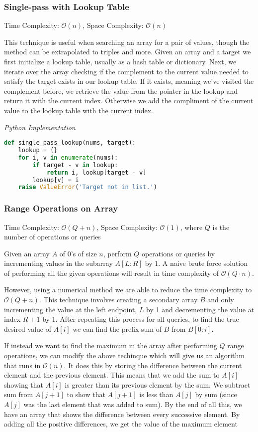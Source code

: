 \documentclass{article}
\newcommand{\bigO}{\mathcal{O}}
\begin{document}
    \subsubsection{Single-pass with Lookup Table}
    Time Complexity: $\bigO(n)$, Space Complexity: $\bigO(n)$
    
    This technique is useful when searching an array for a pair of values, though the method can be extrapolated to triples and more. Given an array and a target we first initialize a lookup table, usually as a hash table or dictionary. Next, we iterate over the array checking if the complement to the current value needed to satisfy the target exists in our lookup table. If it exists, meaning we've visited the complement before, we retrieve the value from the pointer in the lookup and return it with the current index. Otherwise we add the compliment of the current value to the lookup table with the current index.


\vspace{8pt} \emph{Python Implementation}
\begin{lstlisting}[language=Python]
def single_pass_lookup(nums, target):
    lookup = {}
    for i, v in enumerate(nums):
        if target - v in lookup:
            return i, lookup[target - v]
        lookup[v] = i
    raise ValueError('Target not in list.')
\end{lstlisting}
    
    \subsubsection{Range Operations on Array}
    Time Complexity: $\bigO(Q + n)$, Space Complexity: $\bigO(1)$, where $Q$ is the number of operations or queries
    
    Given an array $A$ of 0's of size $n$, perform $Q$ operations or queries by incrementing values in the subarray $A[L: R]$ by 1. A naive brute force solution of performing all the given operations will result in time complexity of $\bigO(Q\cdot n)$. 
    
    However, using a numerical method we are able to reduce the time complexity to $\bigO(Q + n)$. This technique involves creating a secondary array $B$ and only incrementing the value at the left endpoint, $L$ by 1 and decrementing the value at index $R + 1$ by 1. After repeating this process for all queries, to find the true desired value of $A[i]$ we can find the prefix sum of $B$ from $B[0:i]$.
    
    If instead we want to find the maximum in the array after performing $Q$ range operations, we can modify the above techinque which will give us an algorithm that runs in $\bigO(n)$. It does this by storing the difference between the current element and the previous element. This means that we add the sum to $A[i]$ showing that $A[i]$ is greater than its previous element by the sum. We subtract sum from $A[j+1]$ to show that $A[j+1]$ is less than $A[j]$ by sum (since $A[j]$ was the last element that was added to sum). By the end of all this, we have an array that shows the difference between every successive element. By adding all the positive differences, we get the value of the maximum element
    
\end{document}
